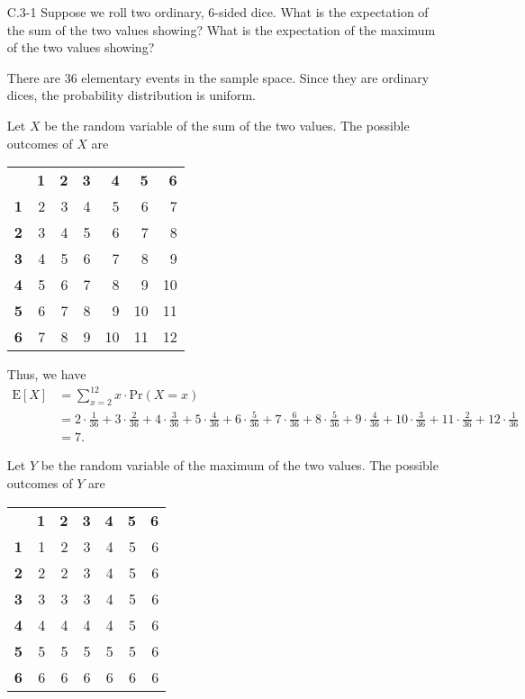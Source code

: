 \begin{enumerate}

\item[C.3{-}1]{Suppose we roll two ordinary, 6-sided dice. What is the
expectation of the sum of the two values showing? What is the expectation of
the maximum of the two values showing?}

\begin{framed}
There are $36$ elementary events in the sample space. Since they are
ordinary dices, the probability distribution is uniform.

Let $X$ be the random variable of the sum of the two values. The possible
outcomes of $X$ are
\begin{center}
\begin{tabular}{rrrrrrr}
  & \textbf{1} & \textbf{2} & \textbf{3} & \textbf{4} & \textbf{5} & \textbf{6}\\
  \textbf{1} & 2 & 3 & 4 & 5  & 6  & 7\\
  \textbf{2} & 3 & 4 & 5 & 6  & 7  & 8\\
  \textbf{3} & 4 & 5 & 6 & 7  & 8  & 9\\
  \textbf{4} & 5 & 6 & 7 & 8  & 9  & 10\\
  \textbf{5} & 6 & 7 & 8 & 9  & 10 & 11\\
  \textbf{6} & 7 & 8 & 9 & 10 & 11 & 12
\end{tabular}
\end{center}

Thus, we have
\begin{equation*}
\begin{aligned}
  \text{E}[X] &= \sum_{x = 2}^{12} x \cdot \text{Pr}(X = x)\\
              &= 2 \cdot \frac{1}{36} + 3 \cdot \frac{2}{36} + 4 \cdot \frac{3}{36} + 5 \cdot \frac{4}{36}
               + 6 \cdot \frac{5}{36} + 7 \cdot \frac{6}{36} + 8 \cdot \frac{5}{36} + 9 \cdot \frac{4}{36}
               + 10 \cdot \frac{3}{36} + 11 \cdot \frac{2}{36} + 12 \cdot \frac{1}{36}\\
              &= 7.
\end{aligned}
\end{equation*}

Let $Y$ be the random variable of the maximum of the two values. The possible
outcomes of $Y$ are

\begin{center}
\begin{tabular}{rrrrrrr}
  & \textbf{1} & \textbf{2} & \textbf{3} & \textbf{4} & \textbf{5} & \textbf{6}\\
  \textbf{1} & 1 & 2 & 3 & 4 & 5 & 6\\
  \textbf{2} & 2 & 2 & 3 & 4 & 5 & 6\\
  \textbf{3} & 3 & 3 & 3 & 4 & 5 & 6\\
  \textbf{4} & 4 & 4 & 4 & 4 & 5 & 6\\
  \textbf{5} & 5 & 5 & 5 & 5 & 5 & 6\\
  \textbf{6} & 6 & 6 & 6 & 6 & 6 & 6
\end{tabular}
\end{center}


\end{framed}
\end{enumerate}
